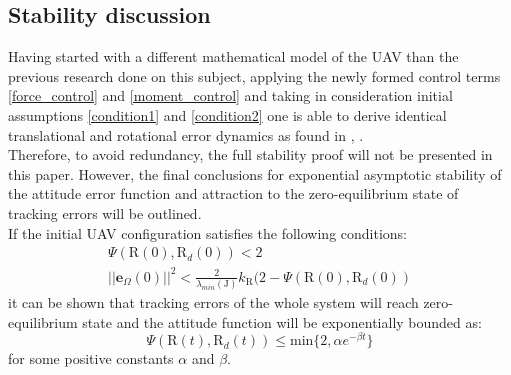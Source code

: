 \subsection{Stability discussion}

Having started with a different mathematical model of the UAV than the previous research done on this subject, applying the newly formed control terms \ref{force_control} and \ref{moment_control} and taking in consideration initial assumptions \ref{condition1} and \ref{condition2} one is able to derive identical translational and rotational error dynamics as found in \cite{LeeClanak1}, \cite{LeeClanak4}. \\
Therefore, to avoid redundancy, the full stability proof will not be presented in this paper. However, the final conclusions for exponential asymptotic stability of the attitude error function and attraction to the zero-equilibrium state of tracking errors will be outlined. \\

If the initial UAV configuration satisfies the following conditions:
\begin{gather}
	\Psi (\text{R}(0), \text{R}_d(0)) < 2 \\
	||\textbf{e}_\Omega(0)||^2 < \frac{2}{\lambda_{min}(\text{J})}k_\text{R}(2 - \Psi(\text{R}(0), \text{R}_d(0))
\end{gather}
it can be shown that tracking errors of the whole system will reach zero-equilibrium state and the attitude function will be exponentially bounded as:
\begin{equation}
	\Psi(\text{R}(t), \text{R}_d(t)) \leq \text{min}\{2, \alpha e^{-\beta t} \}
\end{equation}
for some positive constants $\alpha$ and $\beta$.